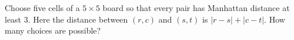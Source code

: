 Choose five cells of a $5\times5$ board so that every pair has Manhattan distance at least $3$. Here the distance between $(r,c)$ and $(s,t)$ is $|r-s|+|c-t|$. How many choices are possible?
